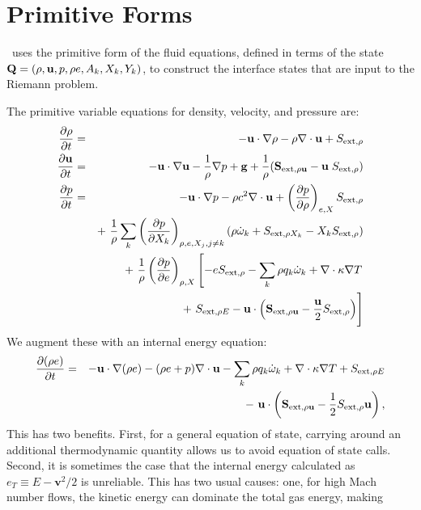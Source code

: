 \section{Primitive Forms}
\castro\ uses the primitive form of the fluid equations, defined in terms of
the state ${\bf Q} = (\rho, {\bf u}, p, \rho e, A_k, X_k, Y_k)$, to construct the
interface states that are input to the Riemann problem.

The primitive variable equations for density, velocity, and pressure are:
\begin{eqnarray}
  \frac{\partial\rho}{\partial t} &=& -\ub\cdot\nabla\rho - \rho\nabla\cdot\ub + S_{{\rm ext},\rho} \\
%
  \frac{\partial\ub}{\partial t} &=& -\ub\cdot\nabla\ub - \frac{1}{\rho}\nabla p + \gb + 
\frac{1}{\rho} (\Sb_{{\rm ext},\rho\ub} - \ub \; S_{{\rm ext},\rho}) \\
\frac{\partial p}{\partial t} &=& -\ub\cdot\nabla p - \rho c^2\nabla\cdot\ub +
\left(\frac{\partial p}{\partial \rho}\right)_{e,X}S_{{\rm ext},\rho}\nonumber\\
&&+\  \frac{1}{\rho}\sum_k\left(\frac{\partial p}{\partial X_k}\right)_{\rho,e,X_j,j\neq k}\left(\rho\dot\omega_k + S_{{\rm ext},\rho X_k} - X_kS_{{\rm ext},\rho}\right)\nonumber\\
&& +\  \frac{1}{\rho}\left(\frac{\partial p}{\partial e}\right)_{\rho,X}\left[-eS_{{\rm ext},\rho} - \sum_k\rho q_k\dot\omega_k + \nabla\cdot\kappa\nabla T \right.\nonumber\\
&& \quad\qquad\qquad\qquad+\ S_{{\rm ext},\rho E} - \ub\cdot\left(\Sb_{{\rm ext},\rho\ub} - \frac{\ub}{2}S_{{\rm ext},\rho}\right)\Biggr] 
\end{eqnarray}
We augment these with an internal energy equation:
\begin{eqnarray}
\frac{\partial(\rho e)}{\partial t} &=& - {\bf u}\cdot\nabla(\rho e) - (\rho e+p)\nabla\cdot{\bf u} - \sum_k \rho q_k\dot\omega_k 
                                        + \nabla\cdot\kappa\nabla T + S_{{\rm ext},\rho E} \nonumber\\
&& -\  {\bf u}\cdot\left({\bf S}_{{\rm ext},\rho{\bf u}}-\frac{1}{2}S_{{\rm ext},\rho}{\bf u}\right), 
\end{eqnarray}
This has two benefits. First, for a general equation of state,
carrying around an additional thermodynamic quantity allows us to
avoid equation of state calls. Second, it is sometimes the case that
the internal energy calculated as $e_T \equiv E - \mathbf{v}^2 / 2$ is
unreliable.  This has two usual causes: one, for high Mach number
flows, the kinetic energy can dominate the total gas energy, making
